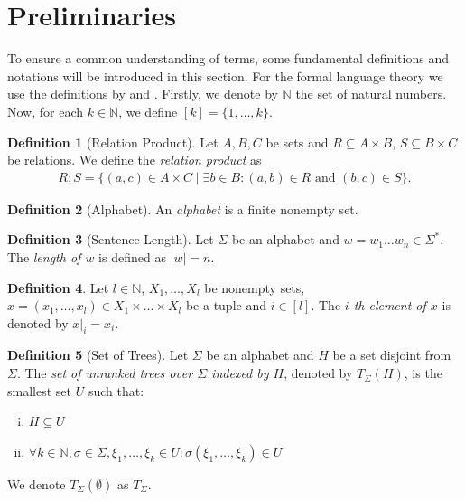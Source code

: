 \documentclass{tudscrartcl}
\theoremstyle{definition}
\newtheorem{definition}{Definition}[section]
\begin{document}
\section{Preliminaries}

To ensure a common understanding of terms, some fundamental definitions and notations will be introduced in this section.
For the formal language theory we use the definitions by \cite{chomsky56} and \cite{lari90}. Firstly, we denote by $\mathbb{N}$ the set of natural numbers.
Now, for each $k \in \mathbb{N}$, we define $[k] = \{1, \ldots, k\}$.

\begin{definition}[Relation Product]
	Let $A, B, C$ be sets
	and $R \subseteq A \times B$, $S \subseteq B \times C$ be relations.
	We define the \emph{relation product} as
	\begin{align*}
		R;S = \{(a,c) \in A \times C \mid
			\exists b \in B: (a,b) \in R \text{ and } (b,c) \in S\}.
	\end{align*}
\end{definition}

\begin{definition}[Alphabet]
	An \emph{alphabet} is a finite nonempty set.
\end{definition}

\begin{definition}[Sentence Length]
	Let $\Sigma$ be an alphabet and $w = w_1 \ldots w_n \in \Sigma^*$.
	The \emph{length of $w$} is defined as $|w| = n$.
\end{definition}

\begin{definition}
	Let $l \in \mathbb{N}$, $X_1, \ldots, X_l$ be nonempty sets,
	$x = (x_1, \ldots, x_l) \in X_1 \times \ldots \times X_l$ be a tuple
	and $i \in [l]$.
	The \emph{$i$-th element of $x$} is denoted by $x|_i = x_i$.
\end{definition}

\begin{definition}[Set of Trees]
	Let $\Sigma$ be an alphabet and $H$ be a set disjoint from $\Sigma$.
	The \emph{set of unranked trees over $\Sigma$ indexed by $H$},
	denoted by $T_{\Sigma}(H)$, is the smallest set $U$ such that:
	\begin{enumerate}[(i)]
		\item $H \subseteq U$
		\item $\forall k \in \mathbb{N}, \sigma \in \Sigma,
			\xi_1, \ldots, \xi_k \in U:
			\sigma(\xi_1, \ldots, \xi_k) \in U$
	\end{enumerate}
	We denote $T_{\Sigma}(\emptyset)$ as $T_{\Sigma}$.
\end{definition}
\end{document}
